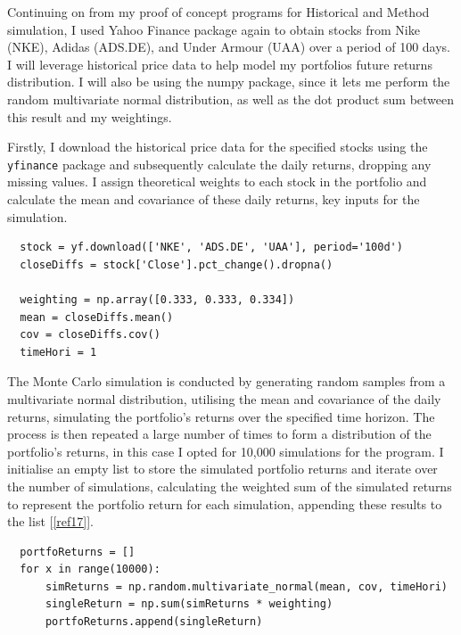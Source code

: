 \documentclass{article}
\begin{document}
Continuing on from my proof of concept programs for Historical and Method simulation, I used Yahoo Finance package again to obtain stocks from Nike (NKE), Adidas (ADS.DE), and Under Armour (UAA) over a period of 100 days. I will leverage historical price data to help model my portfolios future returns distribution. I will also be using the numpy package, since it lets me perform the random multivariate normal distribution, as well as the dot product sum between this result and my weightings. \\\vspace{0.3cm}


Firstly, I download the historical price data for the specified stocks using the \texttt{yfinance} package and subsequently  calculate the daily returns, dropping any missing values. I assign theoretical weights to each stock in the portfolio and calculate the mean and covariance of these daily returns, key inputs for the simulation.\\\vspace{0.3cm}

\begin{verbatim}
  stock = yf.download(['NKE', 'ADS.DE', 'UAA'], period='100d')
  closeDiffs = stock['Close'].pct_change().dropna()

  weighting = np.array([0.333, 0.333, 0.334])
  mean = closeDiffs.mean()
  cov = closeDiffs.cov()
  timeHori = 1
\end{verbatim}

\vspace{0.3cm}
The Monte Carlo simulation is conducted by generating random samples from a multivariate normal distribution, utilising the mean and covariance of the daily returns, simulating the portfolio's returns over the specified time horizon. The process is then repeated a large number of times to form a distribution of the portfolio's returns, in this case I opted for 10,000 simulations for the program. I initialise an empty list to store the simulated portfolio returns and iterate over the number of simulations, calculating the weighted sum of the simulated returns to represent the portfolio return for each simulation, appending these results to the list [\ref{ref17}].\\\vspace{0.3cm}

\begin{verbatim}
  portfoReturns = []
  for x in range(10000):
      simReturns = np.random.multivariate_normal(mean, cov, timeHori)
      singleReturn = np.sum(simReturns * weighting)
      portfoReturns.append(singleReturn)
\end{verbatim}
\end{document}
